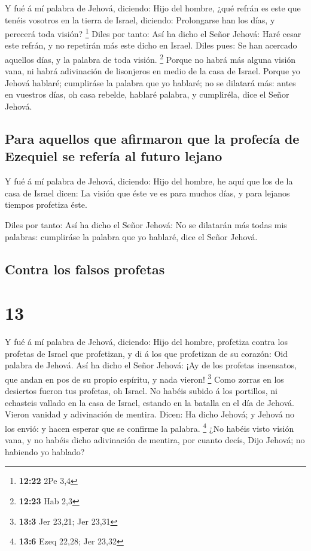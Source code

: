  Y fué á mí palabra de Jehová, diciendo:  Hijo
del hombre, ¿qué refrán es este que tenéis vosotros en la tierra de
Israel, diciendo: Prolongarse han los días, y perecerá toda visión?
\footnote{\textbf{12:22} 2Pe 3,4}  Diles por tanto: Así ha
dicho el Señor Jehová: Haré cesar este refrán, y no repetirán más este
dicho en Israel. Diles pues: Se han acercado aquellos días, y la palabra
de toda visión. \footnote{\textbf{12:23} Hab 2,3}  Porque
no habrá más alguna visión vana, ni habrá adivinación de lisonjeros en
medio de la casa de Israel.  Porque yo Jehová hablaré;
cumpliráse la palabra que yo hablaré; no se dilatará más: antes en
vuestros días, oh casa rebelde, hablaré palabra, y cumpliréla, dice el
Señor Jehová.

\hypertarget{para-aquellos-que-afirmaron-que-la-profecuxeda-de-ezequiel-se-referuxeda-al-futuro-lejano}{%
\subsection{Para aquellos que afirmaron que la profecía de Ezequiel se
refería al futuro
lejano}\label{para-aquellos-que-afirmaron-que-la-profecuxeda-de-ezequiel-se-referuxeda-al-futuro-lejano}}

 Y fué á mí palabra de Jehová, diciendo:  Hijo
del hombre, he aquí que los de la casa de Israel dicen: La visión que
éste ve es para muchos días, y para lejanos tiempos profetiza éste.

 Diles por tanto: Así ha dicho el Señor Jehová: No se
dilatarán más todas mis palabras: cumpliráse la palabra que yo hablaré,
dice el Señor Jehová.

\hypertarget{contra-los-falsos-profetas}{%
\subsection{Contra los falsos
profetas}\label{contra-los-falsos-profetas}}

\hypertarget{section-12}{%
\section{13}\label{section-12}}

 Y fué á mí palabra de Jehová, diciendo:  Hijo
del hombre, profetiza contra los profetas de Israel que profetizan, y di
á los que profetizan de su corazón: Oid palabra de Jehová. 
Así ha dicho el Señor Jehová: ¡Ay de los profetas insensatos, que andan
en pos de su propio espíritu, y nada vieron! \footnote{\textbf{13:3} Jer
  23,21; Jer 23,31}  Como zorras en los desiertos fueron tus
profetas, oh Israel.  No habéis subido á los portillos, ni
echasteis vallado en la casa de Israel, estando en la batalla en el día
de Jehová.  Vieron vanidad y adivinación de mentira. Dicen:
Ha dicho Jehová; y Jehová no los envió: y hacen esperar que se confirme
la palabra. \footnote{\textbf{13:6} Ezeq 22,28; Jer 23,32} 
¿No habéis visto visión vana, y no habéis dicho adivinación de mentira,
por cuanto decís, Dijo Jehová; no habiendo yo hablado?

